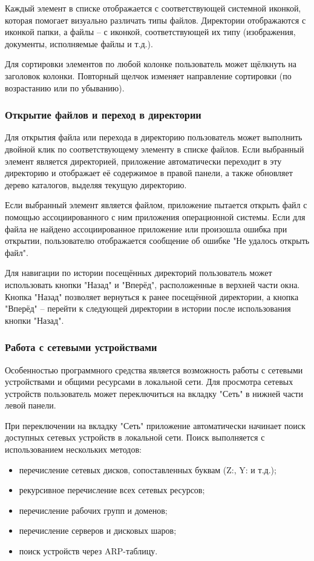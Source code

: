 Каждый элемент в списке отображается с соответствующей системной иконкой, которая помогает визуально различать типы файлов. Директории отображаются с иконкой папки, а файлы -- с иконкой, соответствующей их типу (изображения, документы, исполняемые файлы и т.д.).

Для сортировки элементов по любой колонке пользователь может щёлкнуть на заголовок колонки. Повторный щелчок изменяет направление сортировки (по возрастанию или по убыванию).

\subsubsection{Открытие файлов и переход в директории}

Для открытия файла или перехода в директорию пользователь может выполнить двойной клик по соответствующему элементу в списке файлов. Если выбранный элемент является директорией, приложение автоматически переходит в эту директорию и отображает её содержимое в правой панели, а также обновляет дерево каталогов, выделяя текущую директорию.

Если выбранный элемент является файлом, приложение пытается открыть файл с помощью ассоциированного с ним приложения операционной системы. Если для файла не найдено ассоциированное приложение или произошла ошибка при открытии, пользователю отображается сообщение об ошибке "Не удалось открыть файл".

Для навигации по истории посещённых директорий пользователь может использовать кнопки "Назад" и "Вперёд", расположенные в верхней части окна. Кнопка "Назад" позволяет вернуться к ранее посещённой директории, а кнопка "Вперёд" -- перейти к следующей директории в истории после использования кнопки "Назад".

\subsubsection{Работа с сетевыми устройствами}

Особенностью программного средства является возможность работы с сетевыми устройствами и общими ресурсами в локальной сети. Для просмотра сетевых устройств пользователь может переключиться на вкладку "Сеть" в нижней части левой панели.

При переключении на вкладку "Сеть" приложение автоматически начинает поиск доступных сетевых устройств в локальной сети. Поиск выполняется с использованием нескольких методов:
\begin{itemize}
    \item перечисление сетевых дисков, сопоставленных буквам (Z:, Y: и т.д.);
    \item рекурсивное перечисление всех сетевых ресурсов;
    \item перечисление рабочих групп и доменов;
    \item перечисление серверов и дисковых шаров;
    \item поиск устройств через ARP-таблицу.
\end{itemize}

